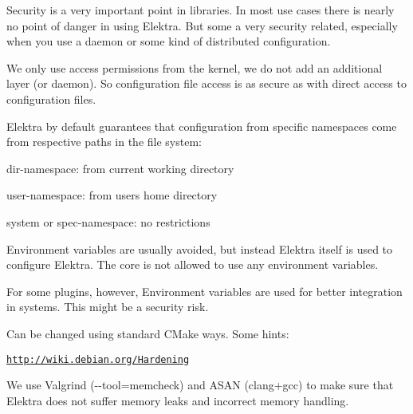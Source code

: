 Security is a very important point in libraries. In most use cases there is nearly no point of danger in using Elektra. But some a very security related, especially when you use a daemon or some kind of distributed configuration.

We only use access permissions from the kernel, we do not add an additional layer (or daemon). So configuration file access is as secure as with direct access to configuration files.

Elektra by default guarantees that configuration from specific namespaces come from respective paths in the file system\+:


\begin{DoxyItemize}
\item {\ttfamily dir}-\/namespace\+: from current working directory
\item {\ttfamily user}-\/namespace\+: from users home directory
\item {\ttfamily system} or {\ttfamily spec}-\/namespace\+: no restrictions
\end{DoxyItemize}

Environment variables are usually avoided, but instead Elektra itself is used to configure Elektra. The core is not allowed to use any environment variables.

For some plugins, however, Environment variables are used for better integration in systems. This might be a security risk.

Can be changed using standard C\+Make ways. Some hints\+:

\href{http://wiki.debian.org/Hardening}{\tt http\+://wiki.\+debian.\+org/\+Hardening}

We use Valgrind ({\ttfamily -\/-\/tool=memcheck}) and A\+S\+AN (clang+gcc) to make sure that Elektra does not suffer memory leaks and incorrect memory handling. 